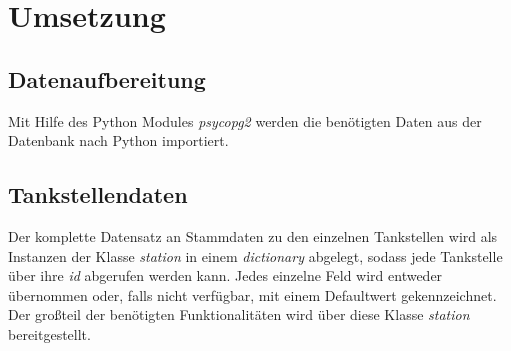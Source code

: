 \documentclass[12pt,a4paper,bibliography=totocnumbered,listof=totocnumbered]{scrartcl}
\begin{document}
\section{Umsetzung}

\subsection{Datenaufbereitung}
Mit Hilfe des Python Modules \textit{psycopg2} werden die benötigten Daten aus der Datenbank nach Python importiert. 

\subsection{Tankstellendaten}
Der komplette Datensatz an Stammdaten zu den einzelnen Tankstellen wird als Instanzen der Klasse \textit{station} in einem \textit{dictionary} abgelegt, sodass jede Tankstelle über ihre \textit{id} abgerufen werden kann. Jedes einzelne Feld wird entweder übernommen oder, falls nicht verfügbar, mit einem Defaultwert gekennzeichnet. Der großteil der benötigten Funktionalitäten wird über diese Klasse \textit{station} bereitgestellt.  

\end{document}
